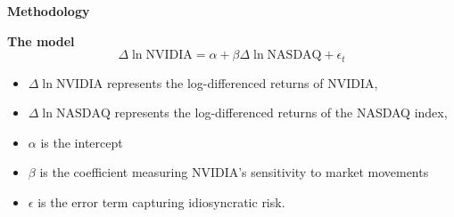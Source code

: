 \documentclass{beamer}
\begin{document}
\begin{frame}{\textbf{Methodology}}
	
\begin{exampleblock}{\textbf{The model}}
\[ \Delta \ln \text{NVIDIA} = \alpha + \beta \Delta \ln \text{NASDAQ} + \epsilon_t\]

\begin{itemize}
	\item \( \Delta \ln \text{NVIDIA}\) represents the log-differenced returns of NVIDIA,
	\item \( \Delta \ln \text{NASDAQ} \) represents the log-differenced returns of the NASDAQ index,
	\item  \( \alpha \) is the intercept
	\item \( \beta \) is the coefficient measuring NVIDIA’s sensitivity to market movements
	\item \( \epsilon \) is the error term capturing idiosyncratic risk.
	
	
\end{itemize}
\end{exampleblock}	
	
\end{frame}
\end{document}
